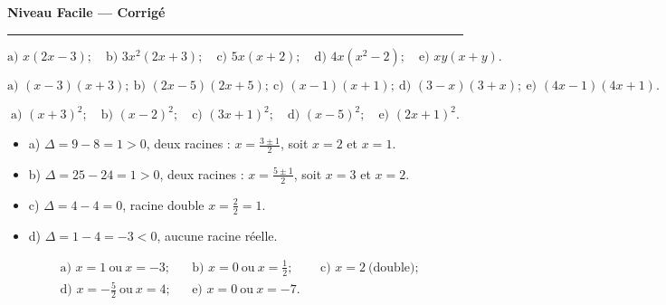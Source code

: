 \documentclass[11pt,a4paper]{article}
\begin{document}
\begin{center}
{\LARGE\bfseries\color{primarydark} Niveau Facile — Corrigé}\\[2pt]
{\color{primary}\rule{0.45\textwidth}{1.2pt}}
\end{center}
\vspace{1mm}

\begin{corrige}
\[ \text{a) }x(2x-3);\quad \text{b) }3x^{2}(2x+3);\quad \text{c) }5x(x+2);\quad
   \text{d) }4x(x^{2}-2);\quad \text{e) }xy(x+y). \]
\end{corrige}

\begin{corrige}
\[ \text{a) }(x-3)(x+3);\ \text{b) }(2x-5)(2x+5);\ \text{c) }(x-1)(x+1);\ \text{d) }(3-x)(3+x);\ \text{e) }(4x-1)(4x+1). \]
\end{corrige}

\begin{corrige}
\[ \text{a) }(x+3)^{2};\quad \text{b) }(x-2)^{2};\quad \text{c) }(3x+1)^{2};\quad
   \text{d) }(x-5)^{2};\quad \text{e) }(2x+1)^{2}. \]
\end{corrige}

\begin{corrige}
\begin{itemize}[leftmargin=1.4em,topsep=1pt,itemsep=1pt]
  \item a) $\Delta=9-8=1>0$, deux racines : $x=\tfrac{3\pm1}{2}$, soit $x=2$ et $x=1$.
  \item b) $\Delta=25-24=1>0$, deux racines : $x=\tfrac{5\pm1}{2}$, soit $x=3$ et $x=2$.
  \item c) $\Delta=4-4=0$, racine double $x=\tfrac{2}{2}=1$.
  \item d) $\Delta=1-4=-3<0$, aucune racine réelle.
\end{itemize}
\end{corrige}

\begin{corrige}
\begin{align*}
&\text{a) }x=1\ \text{ou}\ x=-3; &&\text{b) }x=0\ \text{ou}\ x=\tfrac12; &&\text{c) }x=2\ \text{(double)};\\
&\text{d) }x=-\tfrac52\ \text{ou}\ x=4; &&\text{e) }x=0\ \text{ou}\ x=-7. &&
\end{align*}
\end{corrige}
\end{document}
